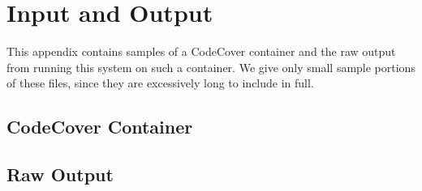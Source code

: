 %
%

\chapter{Input and Output}\label{appc:io}


This appendix contains samples of a CodeCover container and the raw output 
from running this system on such a container.  We give only small sample
portions of these files, since they are excessively long to include in full.

\section{CodeCover Container}\label{sec:cont}



\section{Raw Output}\label{sec:listswap}


